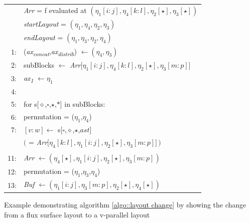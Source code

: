 \begin{Example}
\begin{tabular}{rl}
 & {\em Arr} = f evaluated at $(\eta_1[i:j], \eta_4[k:l], \eta_2[\star], \eta_3[\star])$\\
 & {\em startLayout} = $(\eta_1 , \eta_4 , \eta_2 , \eta_3 )$\\
 & {\em endLayout} =  $(\eta_1 , \eta_3 , \eta_2 , \eta_4 )$\\
 
 1: & ({\em ax\textsubscript{concat}},{\em ax\textsubscript{distrib}}) $\leftarrow (\eta_4,\eta_3)$\\
 2: & subBlocks $\leftarrow$ {\em Arr}$\big[\eta_1[i:j], \eta_4[k:l], \eta_2[\star], \eta_3[m:p]\big]$\\
 3: & {\em ax\textsubscript{1}} $\leftarrow \eta_1$\\
 4: & \\
 5: & for s[$\diamond$,$\square$,$\star$,$\ast$] in subBlocks:\\
 6: & \hspace*{2em} permutation = ($\eta_1$,$\eta_4$)\\
 7: & \hspace*{2em}{\em Buf}$[v:w] \leftarrow$ s[$\square$,$\diamond$,$\star$,$ast$]\\
 & \hspace*{7em} $\big($ = {\em Arr}$\big[\eta_4[k:l], \eta_1[i:j], \eta_2[\star], \eta_3[m:p]\big]\, \big)$\\
 \\
 11: & {\em Arr} $\leftarrow (\eta_4[\star], \eta_1[i:j], \eta_2[\star], \eta_3[m:p])$\\
 12: & permutation = ($\eta_1$,$\eta_3$,$\eta_4$)\\
 13: & {\em Buf} $\leftarrow (\eta_1[i:j], \eta_3[m:p], \eta_2[\star], \eta_4[\star])$\\
\end{tabular}
 \caption{\label{example::layout change1}Example demonstrating algorithm \ref{algo::layout change} by showing the change from a flux surface layout to a v-parallel layout}
\end{Example}

